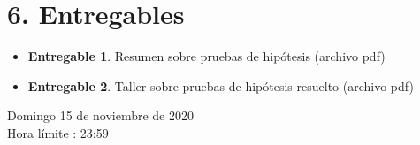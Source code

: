 \documentclass[base=hide,11pt]{elegantbook}
\begin{document}
\section*{6. Entregables}

\begin{itemize}
	\item 	{\bf Entregable 1}. Resumen sobre pruebas de hipótesis (archivo pdf)
	\item 	{\bf Entregable 2}. Taller sobre pruebas de hipótesis resuelto (archivo pdf)
\end{itemize}
\vspace{.5cm}
Domingo 15 de noviembre de 2020\\
Hora límite : 23:59 


\end{document}
